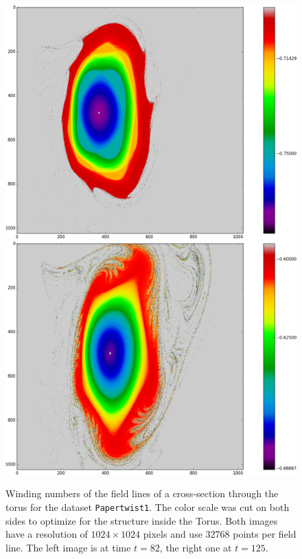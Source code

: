 \documentclass{article}
\begin{document}
\begin{figure}[!htb]
  \includegraphics[width=\linewidth]{Figures/Rings_Papertwist_twist1_82_steps32k.png}
\endminipage\hfill
{}
  \includegraphics[width=\linewidth]{Figures/Rings_Papertwist_twist1_125_steps32k.png}
\endminipage
	\caption{Winding numbers of the field lines of a cross-section through the torus for the dataset \texttt{Papertwist1}. The color scale was cut on both sides to optimize for the structure inside the Torus. Both images have a resolution of $1024\times 1024$ pixels and use $32768$ points per field line. The left image is at time $t=82$, the right one at $t=125$.}\label{fig:125-32k}\label{fig:82-32k}
\end{figure}
\end{document}
